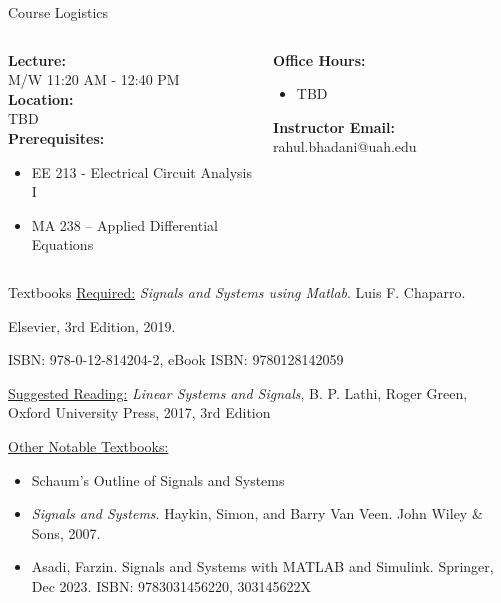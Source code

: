 \documentclass[aspectratio=169,xcolor=dvipsnames,svgnames,x11names,fleqn]{beamer}
\begin{document}

\begin{frame}{Course Logistics
}
  \begin{columns}[T] %
    \begin{column}{0.5\textwidth}
      \textbf{Lecture:} \\
      M/W 11:20 AM - 12:40 PM \\
      \vspace{0.3cm}
      \textbf{Location:} \\
      TBD \\
      \vspace{0.3cm}
      \textbf{Prerequisites:}
      \begin{itemize}
        \item EE 213 - Electrical Circuit Analysis I
        \item MA 238 – Applied Differential Equations
      \end{itemize}
    \end{column}
    \begin{column}{0.5\textwidth}
      \textbf{Office Hours:}
      \begin{itemize}
        \item TBD
      \end{itemize}
      \textbf{Instructor Email:} rahul.bhadani@uah.edu
    \end{column}
  \end{columns}
\end{frame}

\begin{frame}{Textbooks}
    \underline{Required:} \emph{\color{DarkGreen}Signals and Systems using Matlab}. Luis F. Chaparro. \par{\color{DarkRed}Elsevier, 3rd Edition, 2019}. \par ISBN: 978-0-12-814204-2, eBook ISBN: 9780128142059\par\vspace{5pt}

        \underline{Suggested Reading:} \textit{Linear Systems and Signals}, B. P. Lathi, Roger Green, Oxford University Press, 2017, 3rd Edition

        \underline{Other Notable Textbooks:}
        \begin{itemize}
            \item Schaum's Outline of Signals and Systems
            \item \textit{Signals and Systems}. Haykin, Simon, and Barry Van Veen. John Wiley \& Sons, 2007.
            \item Asadi, Farzin. Signals and Systems with MATLAB and Simulink. Springer, Dec 2023. ISBN: 9783031456220, 303145622X
        \end{itemize}
\end{frame}
\end{document}
